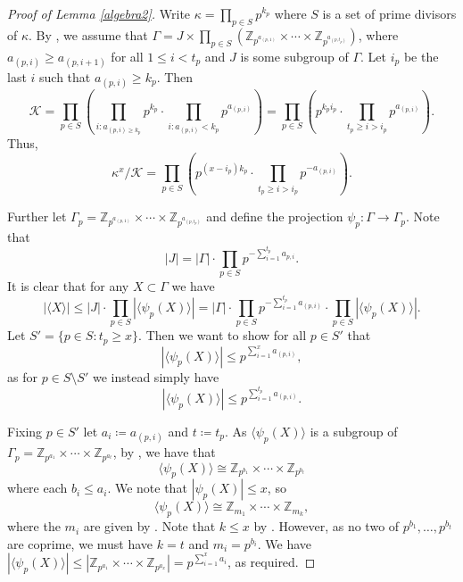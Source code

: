 \documentclass{article}
\newcommand{\cK}{\mathcal{K} }
\theoremstyle{definition}
\begin{document}
\begin{proof}[Proof of Lemma \ref{algebra2}]
    Write $\kappa=\prod_{p\in S} p^{k_p}$ where $S$ is a set of prime divisors of $\kappa$.
 By ,  we assume that $  \Gamma=J\times \prod_{p\in S}\left( \mathbb{Z}_{p^{a_{(p,1)}}} \times \cdots  \times \mathbb{Z}_{p^{a_{(p,t_p)}}}\right)$, where $a_{(p,i)}\geq a_{(p,i+1)}$ for all $1 \le i<t_p$ and $J$ is some subgroup of $\Gamma$. Let $i_p$ be the last $i$ such that $a_{(p,i)}\geq k_p$.  Then   $$\cK = \prod_{p\in S} \left(\prod _{i:a_{(p,i)\geq k_p}}p^{k_p}\cdot \prod_{i:a_{(p,i)}<k_p}p^{a_{(p,i)}}\right)=\prod_{p\in S} \left(p^{k_pi_p}\cdot \prod_{t_p\geq i>i_p}p^{a_{(p,i)}}\right).$$  Thus, $$\kappa^x/\cK =\prod_{p\in S} \left(p^{(x-i_p)k_p}\cdot \prod_{t_p\geq i>i_p}p^{-a_{(p,i)}}\right).$$
    
    Further let $\Gamma_p=\mathbb{Z}_{p^{a_{(p,1)}}} \times \cdots  \times \mathbb{Z}_{p^{a_{(p,t_p)}}}$ and define the projection $\psi_p:\Gamma\to \Gamma_p$. Note that $$|J| = |\Gamma|\cdot \prod_{p\in S}p^{-\sum_{i=1}^{t_p} a_{p,i}}.$$
    It is clear that for any $X\subset \Gamma$ we have $$|\langle X \rangle| \leq |J| \cdot \prod_{p\in S}|\langle \psi_p(X)\rangle|=|\Gamma|\cdot \prod_{p\in S}p^{-\sum_{i=1}^{t_p} a_{(p,i)}} \cdot \prod_{p\in S}|\langle \psi_p(X)\rangle|.$$ Let $S'=\{p\in S: t_p\geq x\}$. Then we want to show for all $p\in S'$ that $$|\langle \psi_p(X)\rangle|\leq p^{\sum_{i= 1}^{x} a_{(p,i)}},$$
    as for $p\in S\setminus S'$ we instead simply have $$|\langle \psi_p(X)\rangle|\leq p^{\sum_{i=1}^{t_p}a_{(p,i)}}.$$

    Fixing $p\in S'$ let $a_i\coloneqq a_{(p,i)}$ and $t\coloneqq t_p$. As $\langle \psi_p(X) \rangle$ is a subgroup of $\Gamma_p = \mathbb{Z}_{p^{a_1}} \times \cdots  \times \mathbb{Z}_{p^{a_t}}$, by , we have that \begin{equation*}\label{eq:prime_decomp}
        \langle \psi_p(X) \rangle \cong \mathbb{Z}_{p^{b_1}} \times \cdots  \times \mathbb{Z}_{p^{b_t}}
    \end{equation*} where each $b_i \le a_i$. We note that $|\psi_p(X)| \le x$, so 
    \begin{equation*}\label{eq:non-prime_decomp}
        \langle \psi_p(X)\rangle \cong \mathbb{Z}_{m_1} \times\cdots\times \mathbb{Z}_{m_k},
    \end{equation*}
    where the $m_i$ are given by . Note that $k \le x$ by . However, as no two of $p^{b_1}, \ldots, p^{b_t}$ are coprime, we must have $k=t$ and $m_i = p^{b_i}$.  We have $|\langle \psi_p(X) \rangle| \le |\mathbb{Z}_{p^{a_1}} \times \cdots  \times \mathbb{Z}_{p^{a_x}}| = p^{\sum_{i=1}^xa_i}$, as required.


\end{proof}
\end{document}
